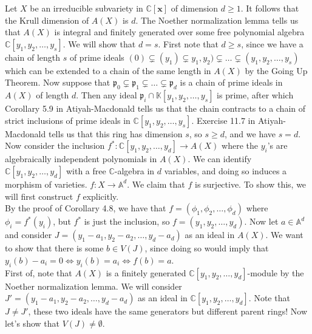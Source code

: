 \documentclass{article}
\theoremstyle{definition}
\newcommand{\C}{\mathbb{C}}
\newcommand{\K}{\mathbb{K}}
\newcommand{\A}{\mathbb{A}}
\newcommand{\x}{\bm{x}}
\begin{document}
Let $X$ be an irreducible subvariety in $\C[\x]$ of dimension $d \geq 1$. It
follows that the Krull dimension of $A(X)$ is $d$. The Noether normalization
lemma tells us that $A(X)$ is integral and finitely generated over some free
polynomial algebra $\C[y_1, y_2, \ldots, y_s]$. We will show that $d = s$.
First note that $d \geq s$, since we have a chain of length $s$ of prime ideals
$(0) \subsetneq (y_1) \subsetneq y_1, y_2) \subsetneq \ldots \subsetneq (y_1,
y_2, \ldots, y_s)$ which can be extended to a chain of the same length in
$A(X)$ by the Going Up Theorem. Now suppose that $\mathfrak{p}_0 \subsetneq
\mathfrak{p}_1 \subsetneq \ldots \subsetneq \mathfrak{p}_d$ is a chain of prime
ideals in $A(X)$ of length $d$. Then any ideal $\mathfrak{p}_i \cap \K[y_1,
y_2, \ldots, y_s]$ is prime, after which Corollary 5.9 in Atiyah-Macdonald
tells us that the chain contracts to a chain of strict inclusions of prime
ideals in $\C[y_1, y_2, \ldots, y_s]$. Exercise 11.7 in Atiyah-Macdonald tells
us that this ring has dimension $s$, so $s \geq d$, and we have $s = d$. \\

Now consider the inclusion $f^{*} : \C[y_1, y_2, \ldots, y_d] \to A(X)$ where
the $y_i$'s are algebraically independent polynomials in $A(X)$. We can
identify $\C[y_1, y_2, \ldots, y_d]$ with a free $\C$-algebra in $d$ variables,
and doing so induces a morphism of varieties. $f : X \to \A^{d}$. We claim that
$f$ is surjective. To show this, we will first construct $f$ explicitly. \\

By the proof of Corollary 4.8, we have that $f =
(\phi_1, \phi_2, \ldots, \phi_d)$ where $\phi_i = f^{*}(y_i)$, but $f^{*}$ is
just the inclusion, so $f = (y_1, y_2, \ldots, y_d)$. Now let $a \in \A^{d}$
and consider $J = (y_1 - a_1, y_2 - a_2, \ldots, y_d - a_d)$ as an ideal in
$A(X)$. We want to show that there is some $b \in V(J)$, since doing so
would imply that $y_i(b) - a_i = 0 \Leftrightarrow y_i(b) = a_i \Leftrightarrow
f(b) = a$. \\ 

First of, note that $A(X)$ is a finitely generated $\C[y_1, y_2, \ldots,
y_d]$-module by the Noether normalization lemma. We will consider $J' = (y_1 -
a_1, y_2 - a_2, \ldots, y_d - a_d)$ as an ideal in $\C[y_1, y_2, \ldots, y_d]$.
Note that $J \not = J'$, these two ideals have the same generators but
different parent rings! Now let's show that $V(J) \not = \emptyset$. \\
\end{document}
